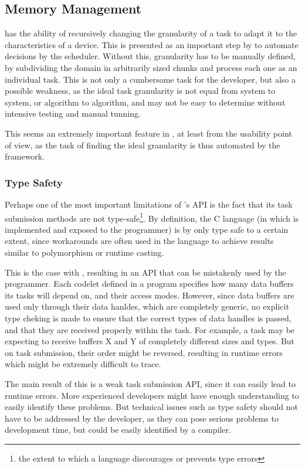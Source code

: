 \documentclass[main.tex]{subfiles}
\begin{document}
\subsection{Memory Management}

\gama has the ability of recursively changing the granularity of a task to adapt it to the characteristics of a device. This is presented as an important step by \gama to automate decisions by the scheduler. Without this, granularity has to be manually defined, by subdividing the domain in arbitrarily sized chunks and process each one as an individual task. This is not only a cumbersome task for the developer, but also a possible weakness, as the ideal task granularity is not equal from system to system, or algorithm to algorithm, and may not be easy to determine without intensive testing and manual tunning.

This seems an extremely important feature in \gama, at least from the usability point of view, as the task of finding the ideal granularity is thus automated by the framework.

\subsubsection{Type Safety} \label{sec:comparison:type_safety}

Perhaps one of the most important limitations of \starpu's API is the fact that its task submission methods are not type-safe\footnote{the extent to which a language discourages or prevents type errors}. By definition, the C language (in which \starpu is implemented and exposed to the programmer) is by only type safe to a certain extent, since workarounds are often used in the language to achieve results similar to polymorphism or runtime casting.

This is the case with \starpu, resulting in an API that can be mistakenly used by the programmer. Each codelet defined in a program specifies how many data buffers its tasks will depend on, and their access modes. However, since data buffers are used only through their data hanldes, which are completely generic, no explicit type cheking is made to ensure that the correct types of data handles is passed, and that they are received properly within the task. For example, a task may be expecting to receive buffers X and Y of completely different sizes and types. But on task submission, their order might be reversed, resulting in runtime errors which might be extremely difficult to trace.

The main result of this is a weak task submission API, since it can easily lead to runtime errors. More experienced developers might have enough understanding to easily identify these problems. But technical issues such as type safety should not have to be addressed by the developer, as they can pose serious problems to development time, but could be easily identified by a compiler.
\end{document}
